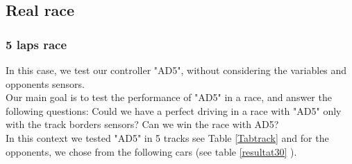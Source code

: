 \documentclass{llncs}
\begin{document}
\subsection{Real race}
\subsubsection{5 laps race}
In this case, we test our controller "AD5", without considering the variables and opponents sensors.\\

Our main goal is to test the performance of "AD5" in a race, and answer the following questions: Could we have a perfect driving in a race with "AD5" only with the track borders sensors? Can we win the race with AD5?\\
In this context we tested "AD5" in 5 tracks see Table \ref{Tabtrack} and for the opponents, we chose from the following cars (see table \ref {resultat30} ).
\\
\end{document}
